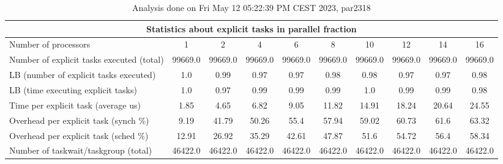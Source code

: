 \begin{table}[h]
\begin{center}
\begin{tabular}{|l|c|c|c|c|c|c|c|c|c|}
\hline
\multicolumn{10}{|c|}{Statistics about explicit tasks in parallel fraction} \\
\hline
\hline
Number of processors & 1 & 2 & 4 & 6 & 8 & 10 & 12 & 14 & 16 \\
\hline
\hline
Number of explicit tasks executed (total)        &         99669.0 &         99669.0 &         99669.0 &         99669.0 &         99669.0 &         99669.0 &         99669.0 &         99669.0 &         99669.0 \\
\hline
LB (number of explicit tasks executed)           &             1.0 &            0.99 &            0.97 &            0.97 &            0.98 &            0.98 &            0.97 &            0.97 &            0.98 \\
\hline
LB (time executing explicit tasks)               &             1.0 &            0.97 &            0.99 &            0.99 &            0.99 &             1.0 &            0.99 &            0.99 &            0.98 \\
\hline
Time per explicit task (average us)                 &            1.85 &            4.65 &            6.82 &            9.05 &           11.82 &           14.91 &           18.24 &           20.64 &           24.55 \\
\hline
Overhead per explicit task (synch \%)             &            9.19 &           41.79 &           50.26 &            55.4 &           57.94 &           59.02 &           60.73 &            61.6 &           63.32 \\
\hline
Overhead per explicit task (sched \%)             &           12.91 &           26.92 &           35.29 &           42.61 &           47.87 &            51.6 &           54.72 &            56.4 &           58.34 \\
\hline
Number of taskwait/taskgroup (total)             &         46422.0 &         46422.0 &         46422.0 &         46422.0 &         46422.0 &         46422.0 &         46422.0 &         46422.0 &         46422.0 \\
\hline
\end{tabular}
\end{center}
\caption{ Analysis done on Fri May 12 05:22:39 PM CEST 2023, par2318}
\end{table}
